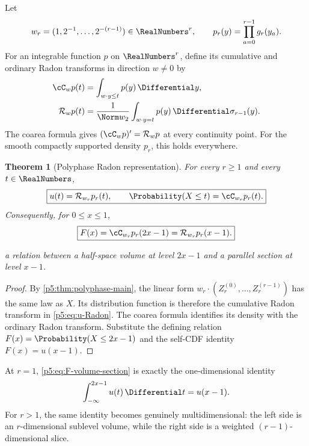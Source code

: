 \documentclass[11pt]{article}
\newtheorem{theorem}{Theorem}[section]
\theoremstyle{definition}
\theoremstyle{remark}
\newcommand{\cR}{\mathcal R}
\begin{document}
Let
\begin{equation}
 w_r=(1,2^{-1},\ldots,2^{-(r-1)})\in\RealNumbers^r,
 \qquad
 p_r(y)=\prod_{a=0}^{r-1}g_r(y_a).                         \label{p5:eq:wr-pr}
\end{equation}
For an integrable function $p$ on $\RealNumbers^r$, define its cumulative and ordinary
Radon transforms in direction $w\ne0$ by
\begin{align}
 \cC_wp(t)&=\int_{w\cdot y\le t}p(y)\,\Differential y,              \label{p5:eq:cumulative-Radon}\\
 \cR_wp(t)&=\frac1{\Norm w_2}
   \int_{w\cdot y=t}p(y)\,\Differential\sigma_{r-1}(y).             \label{p5:eq:Radon-def}
\end{align}
The coarea formula gives $(\cC_wp)'=\cR_wp$ at every continuity point.
For the smooth compactly supported density $p_r$, this holds everywhere.

\begin{theorem}[Polyphase Radon representation]
\label{p5:thm:Radon-representation}
For every $r\ge1$ and every $t\in\RealNumbers$,
\begin{equation}
 \boxed{\displaystyle
 u(t)=\cR_{w_r}p_r(t),
 \qquad
 \Probability(X\le t)=\cC_{w_r}p_r(t).}                          \label{p5:eq:u-Radon}
\end{equation}
Consequently, for $0\le x\le1$,
\begin{equation}
 \boxed{\displaystyle
 F(x)=\cC_{w_r}p_r(2x-1)=\cR_{w_r}p_r(x-1).}              \label{p5:eq:F-volume-section}
\end{equation}

a relation between a half-space volume at level $2x-1$ and a parallel section
at level $x-1$.
\end{theorem}

\begin{proof}
By \cref{p5:thm:polyphase-main}, the linear form
$w_r\cdot(Z_r^{(0)},\ldots,Z_r^{(r-1)})$ has the same law as $X$.
Its distribution function is therefore the cumulative Radon transform in
\eqref{p5:eq:u-Radon}.  The coarea formula identifies its density with the
ordinary Radon transform.  Substitute the defining relation
$F(x)=\Probability(X\le2x-1)$ and the self-CDF identity $F(x)=u(x-1)$.
\end{proof}

\begin{remark}
At $r=1$, \eqref{p5:eq:F-volume-section} is exactly the one-dimensional identity
\[
 \int_{-\infty}^{2x-1}u(t)\,\Differential t=u(x-1).
\]
For $r>1$, the same identity becomes genuinely multidimensional: the left side
is an $r$-dimensional sublevel volume, while the right side is a weighted
$(r-1)$-dimensional slice.
\end{remark}
\end{document}
